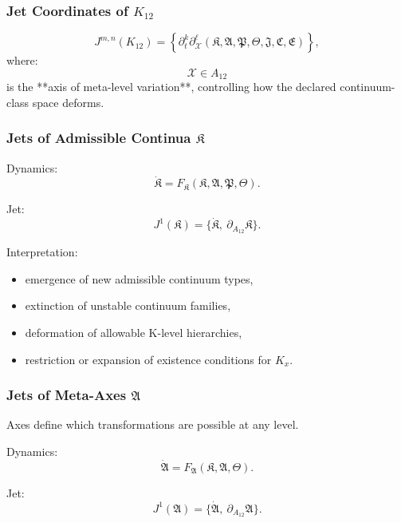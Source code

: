 \subsubsection{Jet Coordinates of $K_{12}$}

\[
J^{m,n}(K_{12}) =
\left\{
\partial_t^k \partial_{\mathcal{X}}^\ell
(\mathfrak{K},\mathfrak{A},\mathfrak{P},\mathfrak{\Theta},\mathfrak{J},\mathfrak{C},\mathfrak{E})
\right\},
\]
where:
\[
\mathcal{X} \in A_{12}
\]
is the **axis of meta-level variation**, controlling how the declared continuum-class space deforms.


\subsubsection{Jets of Admissible Continua $\mathfrak{K}$}

Dynamics:
\[
\dot{\mathfrak{K}}
=
F_{\mathfrak{K}}(\mathfrak{K},\mathfrak{A},\mathfrak{P},\mathfrak{\Theta}).
\]

Jet:
\[
J^1(\mathfrak{K})
= \{\dot{\mathfrak{K}},\ \partial_{A_{12}}\mathfrak{K}\}.
\]

Interpretation:
\begin{itemize}
    \item emergence of new admissible continuum types,
    \item extinction of unstable continuum families,
    \item deformation of allowable K-level hierarchies,
    \item restriction or expansion of existence conditions for $K_x$.
\end{itemize}


\subsubsection{Jets of Meta-Axes $\mathfrak{A}$}

Axes define which transformations are possible at any level.

Dynamics:
\[
\dot{\mathfrak{A}}
=
F_{\mathfrak{A}}(\mathfrak{K},\mathfrak{A},\mathfrak{\Theta}).
\]

Jet:
\[
J^1(\mathfrak{A})
= \{\dot{\mathfrak{A}},\ \partial_{A_{12}}\mathfrak{A}\}.
\]

